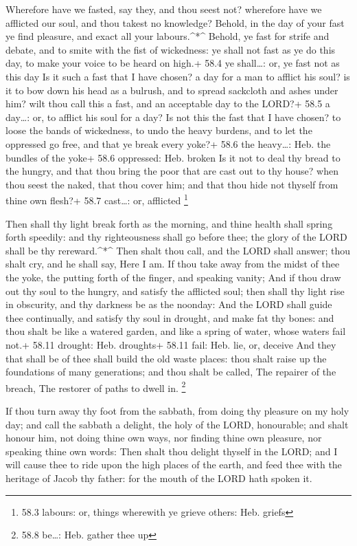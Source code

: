  Wherefore have we fasted, say they, and thou seest not?
wherefore have we afflicted our soul, and thou takest no knowledge?
Behold, in the day of your fast ye find pleasure, and exact all your
labours.\^{}*\^{}  Behold, ye fast for strife and debate,
and to smite with the fist of wickedness: ye shall not fast as ye do
this day, to make your voice to be heard on high.+ 58.4 ye shall\ldots:
or, ye fast not as this day  Is it such a fast that I have
chosen? a day for a man to afflict his soul? is it to bow down his head
as a bulrush, and to spread sackcloth and ashes under him? wilt thou
call this a fast, and an acceptable day to the LORD?+ 58.5 a day\ldots:
or, to afflict his soul for a day?  Is not this the fast
that I have chosen? to loose the bands of wickedness, to undo the heavy
burdens, and to let the oppressed go free, and that ye break every
yoke?+ 58.6 the heavy\ldots: Heb. the bundles of the yoke+ 58.6
oppressed: Heb. broken  Is it not to deal thy bread to the
hungry, and that thou bring the poor that are cast out to thy house?
when thou seest the naked, that thou cover him; and that thou hide not
thyself from thine own flesh?+ 58.7 cast\ldots: or, afflicted
\footnote{58.3 labours: or, things wherewith ye grieve others: Heb.
  griefs}

 Then shall thy light break forth as the morning, and thine
health shall spring forth speedily: and thy righteousness shall go
before thee; the glory of the LORD shall be thy rereward.\^{}*\^{}
 Then shalt thou call, and the LORD shall answer; thou shalt
cry, and he shall say, Here I am. If thou take away from the midst of
thee the yoke, the putting forth of the finger, and speaking vanity;
 And if thou draw out thy soul to the hungry, and satisfy
the afflicted soul; then shall thy light rise in obscurity, and thy
darkness be as the noonday:  And the LORD shall guide thee
continually, and satisfy thy soul in drought, and make fat thy bones:
and thou shalt be like a watered garden, and like a spring of water,
whose waters fail not.+ 58.11 drought: Heb. droughts+ 58.11 fail: Heb.
lie, or, deceive  And they that shall be of thee shall
build the old waste places: thou shalt raise up the foundations of many
generations; and thou shalt be called, The repairer of the breach, The
restorer of paths to dwell in. \footnote{58.8 be\ldots: Heb. gather thee
  up}

 If thou turn away thy foot from the sabbath, from doing
thy pleasure on my holy day; and call the sabbath a delight, the holy of
the LORD, honourable; and shalt honour him, not doing thine own ways,
nor finding thine own pleasure, nor speaking thine own words:
 Then shalt thou delight thyself in the LORD; and I will
cause thee to ride upon the high places of the earth, and feed thee with
the heritage of Jacob thy father: for the mouth of the LORD hath spoken
it.


